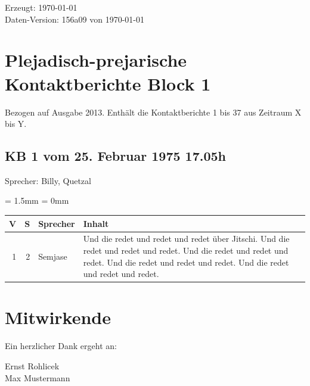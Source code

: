 \documentclass[ngerman,10pt]{book}
\begin{document}
\noindent Erzeugt: \today \\
Daten-Version: 156a09 von \today

\newpage



\tableofcontents



\mainmatter

\chapter*{Plejadisch-prejarische Kontaktberichte Block 1}

Bezogen auf Ausgabe 2013. Enthält die Kontaktberichte 1 bis 37 aus Zeitraum X bis Y.



\section{KB 1 vom 25. Februar 1975 17.05h}

Sprecher: Billy, Quetzal

\tabulinesep = 1.5mm
\extrarowsep = 0mm
\begin{longtabu} to \linewidth {rrlX}


\rowfont\bfseries V & S & Sprecher & Inhalt \\ \hline
\endhead

\hline
\endfoot

\hline
\endlastfoot

1 & 2 & Semjase & Und die redet und redet und redet über Jitschi. Und die redet und redet und redet. Und die redet und redet und redet. Und die redet und redet und redet. Und die redet und redet und redet. \\
\end{longtabu}









\chapter*{Mitwirkende}
\label{ch:mitwirkende}

Ein herzlicher Dank ergeht an:

\noindent Ernst Rohlicek \\
Max Mustermann



\printindex
\end{document}

